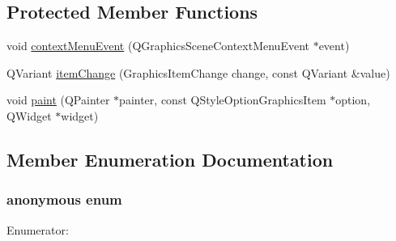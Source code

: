 \subsection*{Protected Member Functions}
\begin{DoxyCompactItemize}
\item 
void \hyperlink{class_diagram_item_a019492721af4b32ea0c9ffec4765717a}{contextMenuEvent} (QGraphicsSceneContextMenuEvent $\ast$event)
\item 
QVariant \hyperlink{class_diagram_item_ada966349ddc26ea7b0c04f4f756d9fc3}{itemChange} (GraphicsItemChange change, const QVariant \&value)
\item 
void \hyperlink{class_diagram_item_a858b872fdce75f7b0f4ee06443db5828}{paint} (QPainter $\ast$painter, const QStyleOptionGraphicsItem $\ast$option, QWidget $\ast$widget)
\end{DoxyCompactItemize}


\subsection{Member Enumeration Documentation}
\hypertarget{class_diagram_item_a7089372ea2f1de7d55fe38db017214df}{
\subsubsection[{"@1}]{\setlength{\rightskip}{0pt plus 5cm}anonymous enum}}
\label{class_diagram_item_a7089372ea2f1de7d55fe38db017214df}
\begin{Desc}
\item[Enumerator: ]\par
\begin{description}
\item[{\em 
\hypertarget{class_diagram_item_a7089372ea2f1de7d55fe38db017214dfa87b5f8f28bda1b1f78244c68b603a570}{
Type}
\label{class_diagram_item_a7089372ea2f1de7d55fe38db017214dfa87b5f8f28bda1b1f78244c68b603a570}
}]\end{description}
\end{Desc}


